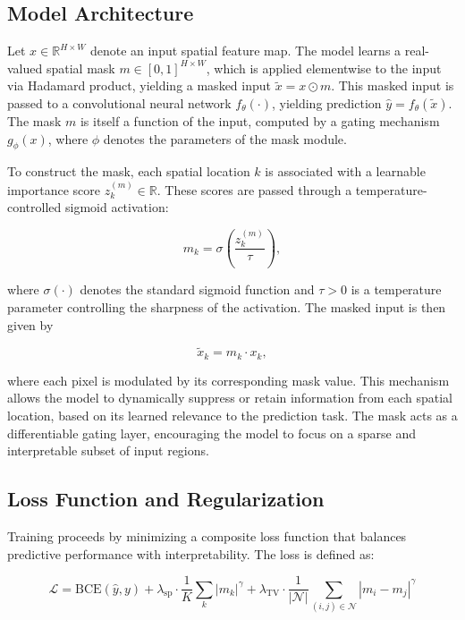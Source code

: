 \documentclass[12pt]{article}
\begin{document}
\subsection{Model Architecture}

Let \( x \in \mathbb{R}^{H \times W} \) denote an input spatial feature map. The model learns a real-valued spatial mask \( m \in [0, 1]^{H \times W} \), which is applied elementwise to the input via Hadamard product, yielding a masked input \( \tilde{x} = x \odot m \). This masked input is passed to a convolutional neural network \( f_\theta(\cdot) \), yielding prediction \( \hat{y} = f_\theta(\tilde{x}) \). The mask \( m \) is itself a function of the input, computed by a gating mechanism \( g_\phi(x) \), where \( \phi \) denotes the parameters of the mask module.

To construct the mask, each spatial location \( k \) is associated with a learnable importance score \( z_k^{(m)} \in \mathbb{R} \). These scores are passed through a temperature-controlled sigmoid activation:

\[
m_k = \sigma\left( \frac{z_k^{(m)}}{\tau} \right),
\]

where \( \sigma(\cdot) \) denotes the standard sigmoid function and \( \tau > 0 \) is a temperature parameter controlling the sharpness of the activation. The masked input is then given by

\[
\tilde{x}_k = m_k \cdot x_k,
\]

where each pixel is modulated by its corresponding mask value. This mechanism allows the model to dynamically suppress or retain information from each spatial location, based on its learned relevance to the prediction task. The mask acts as a differentiable gating layer, encouraging the model to focus on a sparse and interpretable subset of input regions.



\subsection{Loss Function and Regularization}

Training proceeds by minimizing a composite loss function that balances predictive performance with interpretability. The loss is defined as:

\begin{equation}
\mathcal{L} = \mathrm{BCE}(\hat{y}, y)
+ \lambda_{\text{sp}} \cdot \frac{1}{K} \sum_{k} |m_k|^\gamma
+ \lambda_{\text{TV}} \cdot \frac{1}{|\mathcal{N}|} \sum_{(i,j)\in\mathcal{N}} |m_i - m_j|^\gamma
\label{eq:loss1}
\end{equation}
\end{document}
